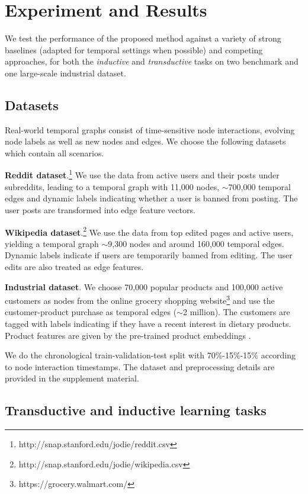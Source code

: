 \documentclass{article} %
\begin{document}
\section{Experiment and Results}
\label{sec:experiment}
We test the performance of the proposed method against a variety of strong baselines (adapted for temporal settings when possible) and competing approaches, for both the \textsl{inductive} and \textsl{transductive} tasks on two benchmark and one large-scale industrial dataset. 

\subsection{Datasets}
\label{sec:dataset}
Real-world temporal graphs consist of time-sensitive node interactions, evolving node labels as well as new nodes and edges. We choose the following datasets which contain all scenarios.

\textbf{Reddit dataset}.\footnote{http://snap.stanford.edu/jodie/reddit.csv} We use the data from active users and their posts under subreddits, leading to a temporal graph with 11,000 nodes,  $\sim$700,000 temporal edges and dynamic labels indicating whether a user is banned from posting. The user posts are transformed into edge feature vectors.

\textbf{Wikipedia dataset}.\footnote{http://snap.stanford.edu/jodie/wikipedia.csv} We use the data from top edited pages and active users, yielding a temporal graph $\sim$9,300 nodes and around 160,000 temporal edges. Dynamic labels indicate if users are temporarily banned from editing. The user edits are also treated as edge features.

\textbf{Industrial dataset}. We choose 70,000 popular products and 100,000 active customers as nodes from the online grocery shopping website\footnote{https://grocery.walmart.com/} and use the customer-product purchase as temporal edges ($\sim$2 million). The customers are tagged with labels indicating if they have a recent interest in dietary products. Product features are given by the pre-trained product embeddings \citep{xu2020product}.

We do the chronological train-validation-test split with 70\%-15\%-15\% according to node interaction timestamps. The dataset and preprocessing details are provided in the supplement material.

\subsection{Transductive and inductive learning tasks}
\end{document}
